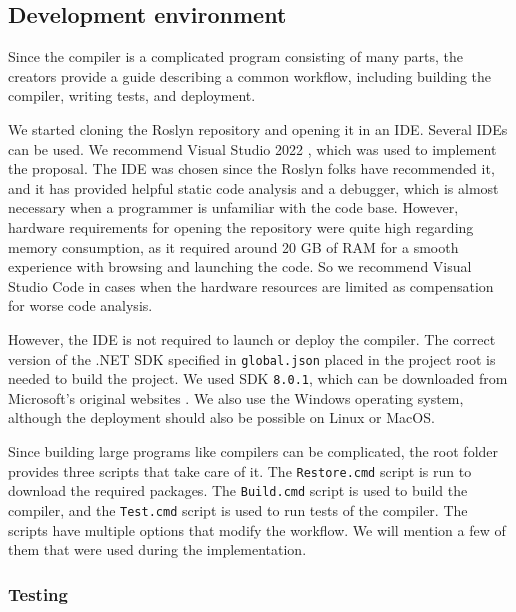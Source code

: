 \subsection{Development environment}

Since the compiler is a complicated program consisting of many parts, the creators provide a guide \cite{online:roslynGuide} describing a common workflow, including building the compiler, writing tests, and deployment.
\par
We started cloning the Roslyn repository \cite{online:roslynRepo} and opening it in an IDE.
Several IDEs can be used. We recommend Visual Studio 2022 \cite{online:vs}, which was used to implement the proposal. 
The IDE was chosen since the Roslyn folks have recommended it, and it has provided helpful static code analysis and a debugger, which is almost necessary when a programmer is unfamiliar with the code base. 
However, hardware requirements for opening the repository were quite high regarding memory consumption, as it required around 20 GB of RAM for a smooth experience with browsing and launching the code. 
So we recommend Visual Studio Code \cite{online:vsCode} in cases when the hardware resources are
limited as compensation for worse code analysis.
\par
However, the IDE is not required to launch or deploy the compiler.
The correct version of the .NET SDK specified in \texttt{global.json} placed in the project root is needed to build the project. 
We used SDK \texttt{8.0.1}, which can be downloaded from Microsoft's original websites \cite{online:sdk}. 
We also use the Windows operating system, although the deployment should also be possible on Linux or MacOS.
\par
Since building large programs like compilers can be complicated, the root folder provides three scripts that take care of it. 
The \texttt{Restore.cmd} script is run to download the required packages. 
The \texttt{Build.cmd} script is used to build the compiler, and the \texttt{Test.cmd} script is used to run tests of the compiler. 
The scripts have multiple options that modify the workflow. We will mention a few of them that were used during the implementation.

\subsubsection{Testing}

